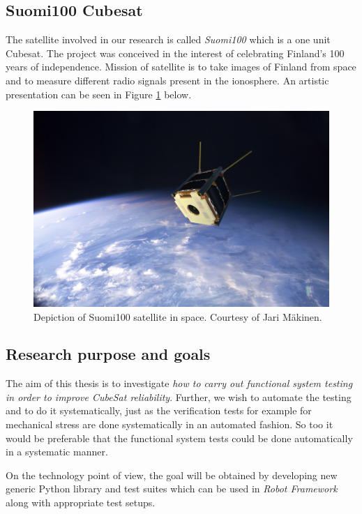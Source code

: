 \documentclass[english,12pt,a4paper,pdftex,elec,utf8]{aaltothesis}
\begin{document}
\subsection{Suomi100 Cubesat} 
The satellite involved in our research is called \textit{Suomi100} which is a one unit Cubesat. The project was conceived in the interest of celebrating Finland's 100 years of independence. Mission of satellite is to take images of Finland from space and to measure different radio signals present in the ionosphere. An artistic presentation can be seen in Figure \ref{s100intro} below.
\begin{figure}[!h]
\centering
\includegraphics[scale=0.2]{s100_orbit}
\caption{Depiction of Suomi100 satellite in space. Courtesy of Jari Mäkinen. \cite{s100blogi}}
\label{s100intro}
\end{figure} 
\subsection{Research purpose and goals}
The aim of this thesis is to investigate \textit{how to carry out
functional system testing in order to improve CubeSat reliability}. Further, we wish to automate the testing and to do it systematically, just as the verification tests for example for mechanical stress are done systematically in an automated fashion. So too it would be preferable that the functional system tests could be done automatically in a systematic manner.\par 
On the technology point of view, the goal will be obtained by developing new generic Python library and test suites which can be used in \textit{Robot Framework} \cite{robotmain} along with appropriate test setups.\par 
\end{document}
